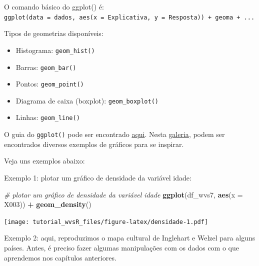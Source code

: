 \documentclass[
  10pt,
  brazil,
  a4paper,
  twoside, notitlepage, openright]{book}
\newenvironment{Shaded}{\begin{snugshade}}{\end{snugshade}}
\newcommand{\CommentTok}[1]{\textcolor[rgb]{0.56,0.35,0.01}{\textit{#1}}}
\newcommand{\DataTypeTok}[1]{\textcolor[rgb]{0.13,0.29,0.53}{#1}}
\newcommand{\KeywordTok}[1]{\textcolor[rgb]{0.13,0.29,0.53}{\textbf{#1}}}
\newcommand{\NormalTok}[1]{#1}
\newcommand{\OperatorTok}[1]{\textcolor[rgb]{0.81,0.36,0.00}{\textbf{#1}}}
\newcommand{\StringTok}[1]{\textcolor[rgb]{0.31,0.60,0.02}{#1}}
\providecommand{\tightlist}{%
  \setlength{\itemsep}{0pt}\setlength{\parskip}{0pt}}
\begin{document}
O comando básico do ggplot() é: \texttt{ggplot(data\ =\ dados,\ aes(x\ =\ Explicativa,\ y\ =\ Resposta))\ +\ geoma\ +\ ...}

Tipos de geometrias disponíveis:

\begin{itemize}
\tightlist
\item
  Histograma: \texttt{geom\_hist()}
\item
  Barras: \texttt{geom\_bar()}
\item
  Pontos: \texttt{geom\_point()}
\item
  Diagrama de caixa (boxplot): \texttt{geom\_boxplot()}
\item
  Linhas: \texttt{geom\_line()}
\end{itemize}

O guia do \texttt{ggplot()} pode ser encontrado \href{https://ggplot2.tidyverse.org/index.html}{aqui}. Nesta \href{https://www.r-graph-gallery.com/}{galeria}, podem ser encontrados diversos exemplos de gráficos para se inspirar.

Veja uns exemplos abaixo:

Exemplo 1: plotar um gráfico de densidade da variável idade:

\begin{Shaded}
\begin{Highlighting}[]
\CommentTok{# plotar um gráfico de densidade da variável idade}
\KeywordTok{ggplot}\NormalTok{(df_wvs7, }\KeywordTok{aes}\NormalTok{(}\DataTypeTok{x =}\NormalTok{ X003)) }\OperatorTok{+}\StringTok{ }\KeywordTok{geom_density}\NormalTok{() }
\end{Highlighting}
\end{Shaded}

\texttt{[image: tutorial\_wvsR\_files/figure-latex/densidade-1.pdf]}

Exemplo 2: aqui, reproduzimos o mapa cultural de Inglehart e Welzel \citeyearpar{inglehart_modernization_2005} para alguns países. Antes, é preciso fazer algumas manipulações com os dados com o que aprendemos nos capítulos anteriores.
\end{document}
